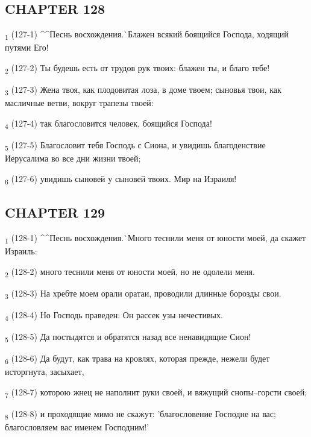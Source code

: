 \subsection{CHAPTER 128}
\begin{tcolorbox}
\textsubscript{1} (127-1) ^^Песнь восхождения.^^ Блажен всякий боящийся Господа, ходящий путями Его!
\end{tcolorbox}
\begin{tcolorbox}
\textsubscript{2} (127-2) Ты будешь есть от трудов рук твоих: блажен ты, и благо тебе!
\end{tcolorbox}
\begin{tcolorbox}
\textsubscript{3} (127-3) Жена твоя, как плодовитая лоза, в доме твоем; сыновья твои, как масличные ветви, вокруг трапезы твоей:
\end{tcolorbox}
\begin{tcolorbox}
\textsubscript{4} (127-4) так благословится человек, боящийся Господа!
\end{tcolorbox}
\begin{tcolorbox}
\textsubscript{5} (127-5) Благословит тебя Господь с Сиона, и увидишь благоденствие Иерусалима во все дни жизни твоей;
\end{tcolorbox}
\begin{tcolorbox}
\textsubscript{6} (127-6) увидишь сыновей у сыновей твоих. Мир на Израиля!
\end{tcolorbox}
\subsection{CHAPTER 129}
\begin{tcolorbox}
\textsubscript{1} (128-1) ^^Песнь восхождения.^^ Много теснили меня от юности моей, да скажет Израиль:
\end{tcolorbox}
\begin{tcolorbox}
\textsubscript{2} (128-2) много теснили меня от юности моей, но не одолели меня.
\end{tcolorbox}
\begin{tcolorbox}
\textsubscript{3} (128-3) На хребте моем орали оратаи, проводили длинные борозды свои.
\end{tcolorbox}
\begin{tcolorbox}
\textsubscript{4} (128-4) Но Господь праведен: Он рассек узы нечестивых.
\end{tcolorbox}
\begin{tcolorbox}
\textsubscript{5} (128-5) Да постыдятся и обратятся назад все ненавидящие Сион!
\end{tcolorbox}
\begin{tcolorbox}
\textsubscript{6} (128-6) Да будут, как трава на кровлях, которая прежде, нежели будет исторгнута, засыхает,
\end{tcolorbox}
\begin{tcolorbox}
\textsubscript{7} (128-7) которою жнец не наполнит руки своей, и вяжущий снопы--горсти своей;
\end{tcolorbox}
\begin{tcolorbox}
\textsubscript{8} (128-8) и проходящие мимо не скажут: 'благословение Господне на вас; благословляем вас именем Господним!'
\end{tcolorbox}
